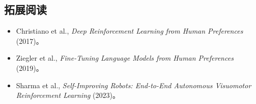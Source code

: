 \subsection{拓展阅读}
\begin{itemize}
    \item Christiano et al., \textit{Deep Reinforcement Learning from Human Preferences} (2017)。
    \item Ziegler et al., \textit{Fine-Tuning Language Models from Human Preferences} (2019)。
    \item Sharma et al., \textit{Self-Improving Robots: End-to-End Autonomous Visuomotor Reinforcement Learning} (2023)。
\end{itemize}


